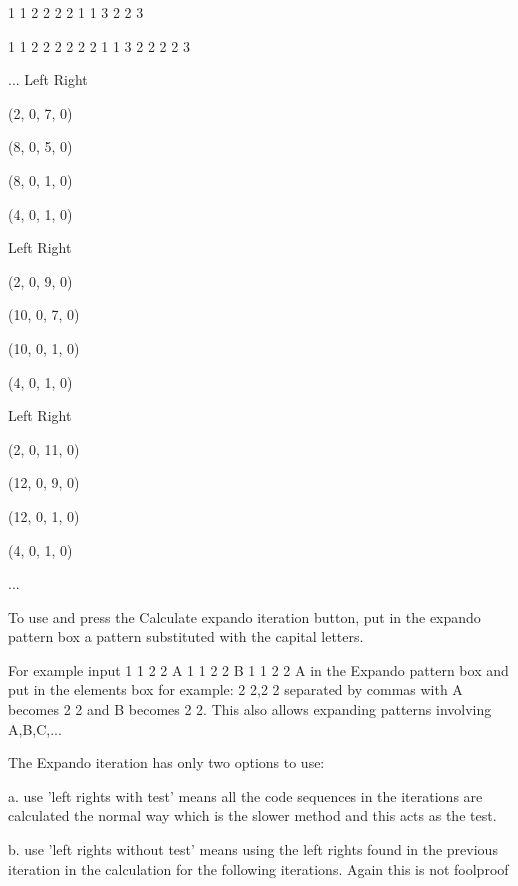 \documentclass[11pt]{report}
\begin{document}
1 1 2 2 2 2 1 1 3 2 2 3

1 1 2 2 2 2 2 2 1 1 3 2 2 2 2 3

...
Left Right

(2, 0, 7, 0)

(8, 0, 5, 0)

(8, 0, 1, 0)

(4, 0, 1, 0)

Left Right

(2, 0, 9, 0)

(10, 0, 7, 0)

(10, 0, 1, 0)

(4, 0, 1, 0)

Left Right

(2, 0, 11, 0)

(12, 0, 9, 0)

(12, 0, 1, 0)

(4, 0, 1, 0)

...

To use and press the Calculate expando iteration button, put in the expando pattern box a pattern
substituted with the capital letters.

For example input 1 1 2 2 A 1 1 2 2 B 1 1 2 2 A in the Expando pattern box and put in the elements box
for example: 2 2,2 2 separated by commas with A becomes 2 2 and B becomes 2 2. This also allows
expanding patterns involving A,B,C,...

The Expando iteration has only two options to use:

a. use 'left rights with test’ means all the code sequences in the iterations are calculated the normal way
which is the slower method and this acts as the test.

b. use 'left rights without test’ means using the left rights found in the previous iteration in the calculation
for the following iterations. Again this is not foolproof
\end{document}
